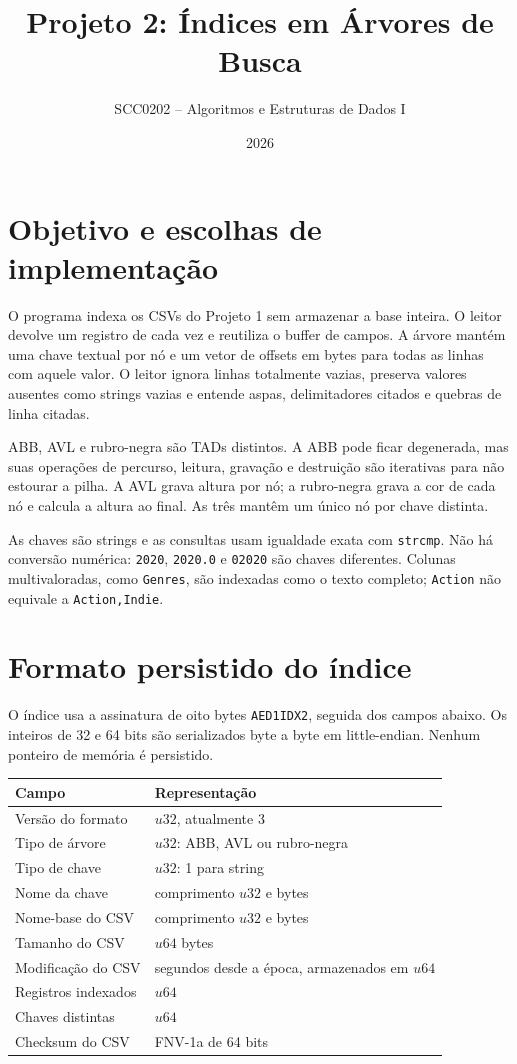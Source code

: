 \documentclass[12pt,a4paper]{article}
\title{Projeto 2: Índices em Árvores de Busca}
\author{SCC0202 -- Algoritmos e Estruturas de Dados I}
\date{2026}
\begin{document}
\maketitle

\section{Objetivo e escolhas de implementação}
O programa indexa os CSVs do Projeto 1 sem armazenar a base inteira. O leitor devolve um registro de cada vez e reutiliza o buffer de campos. A árvore mantém uma chave textual por nó e um vetor de offsets em bytes para todas as linhas com aquele valor. O leitor ignora linhas totalmente vazias, preserva valores ausentes como strings vazias e entende aspas, delimitadores citados e quebras de linha citadas.

ABB, AVL e rubro-negra são TADs distintos. A ABB pode ficar degenerada, mas suas operações de percurso, leitura, gravação e destruição são iterativas para não estourar a pilha. A AVL grava altura por nó; a rubro-negra grava a cor de cada nó e calcula a altura ao final. As três mantêm um único nó por chave distinta.

As chaves são strings e as consultas usam igualdade exata com \texttt{strcmp}. Não há conversão numérica: \texttt{2020}, \texttt{2020.0} e \texttt{02020} são chaves diferentes. Colunas multivaloradas, como \texttt{Genres}, são indexadas como o texto completo; \texttt{Action} não equivale a \texttt{Action,Indie}.

\section{Formato persistido do índice}
O índice usa a assinatura de oito bytes \texttt{AED1IDX2}, seguida dos campos abaixo. Os inteiros de 32 e 64 bits são serializados byte a byte em little-endian. Nenhum ponteiro de memória é persistido.
\begin{center}
\begin{tabular}{ll}
\toprule
Campo & Representação \\
\midrule
Versão do formato & $u32$, atualmente 3 \\
Tipo de árvore & $u32$: ABB, AVL ou rubro-negra \\
Tipo de chave & $u32$: 1 para string \\
Nome da chave & comprimento $u32$ e bytes \\
Nome-base do CSV & comprimento $u32$ e bytes \\
Tamanho do CSV & $u64$ bytes \\
Modificação do CSV & segundos desde a época, armazenados em $u64$ \\
Registros indexados & $u64$ \\
Chaves distintas & $u64$ \\
Checksum do CSV & FNV-1a de 64 bits \\
\bottomrule
\end{tabular}
\end{center}
\end{document}
